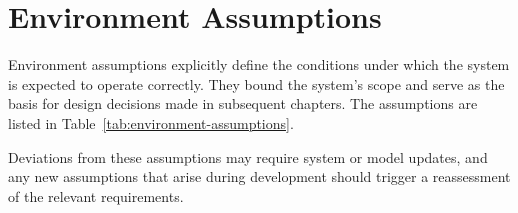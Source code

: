 \documentclass[12pt, a4paper]{report}
\begin{document}
\section{Environment Assumptions}

Environment assumptions explicitly define the conditions under which the system is expected to operate correctly. They bound the system's scope and serve as the basis for design decisions made in subsequent chapters. The assumptions are listed in Table~\ref{tab:environment-assumptions}. 

Deviations from these assumptions may require system or model updates, and any new assumptions that arise during development should trigger a reassessment of the relevant requirements.
\end{document}
